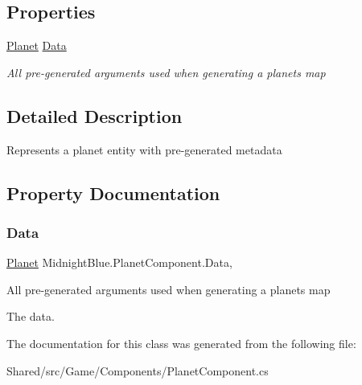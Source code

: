\subsection*{Properties}
\begin{DoxyCompactItemize}
\item 
\hyperlink{class_midnight_blue_1_1_planet}{Planet} \hyperlink{class_midnight_blue_1_1_planet_component_a2beca332569c149699a62bdf33684a25}{Data}
\begin{DoxyCompactList}\small\item\em All pre-\/generated arguments used when generating a planets map \end{DoxyCompactList}\end{DoxyCompactItemize}


\subsection{Detailed Description}
Represents a planet entity with pre-\/generated metadata 



\subsection{Property Documentation}
\hypertarget{class_midnight_blue_1_1_planet_component_a2beca332569c149699a62bdf33684a25}{}\label{class_midnight_blue_1_1_planet_component_a2beca332569c149699a62bdf33684a25} 
\subsubsection{\texorpdfstring{Data}{Data}}
{\footnotesize\ttfamily \hyperlink{class_midnight_blue_1_1_planet}{Planet} Midnight\+Blue.\+Planet\+Component.\+Data\hspace{0.3cm}{\ttfamily [get]}, {\ttfamily [set]}}



All pre-\/generated arguments used when generating a planets map 

The data.

The documentation for this class was generated from the following file\+:\begin{DoxyCompactItemize}
\item 
Shared/src/\+Game/\+Components/Planet\+Component.\+cs\end{DoxyCompactItemize}
